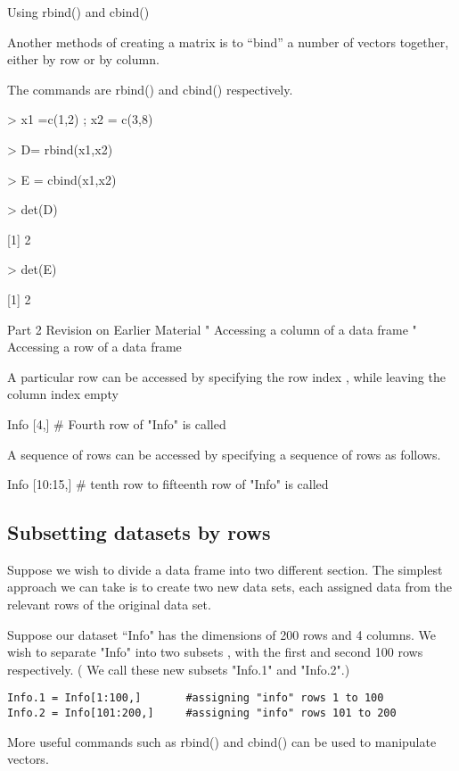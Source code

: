  








Using rbind() and cbind()

Another methods of creating a matrix is to “bind” a number of vectors together, either by row or by column. 

The commands are rbind() and cbind() respectively.








> x1 =c(1,2) ; x2 = c(3,8)                                                


> D= rbind(x1,x2)


> E = cbind(x1,x2)


> det(D)


[1] 2


> det(E)


[1] 2

 







Part 2 Revision on Earlier Material
"	Accessing a column of a data frame
"	Accessing a row of a data frame

A particular row can be accessed by specifying the row index , while leaving the column index empty

Info [4,]			# Fourth row of "Info" is called

A sequence of rows can be accessed by specifying a sequence of rows as follows.

Info [10:15,]		# tenth row to fifteenth row of "Info" is called


\subsection{Subsetting datasets by rows}

Suppose we wish to divide a data frame into two different section. The simplest approach we can take is to create two new data sets, each assigned data from the relevant rows of the original data set.

Suppose our dataset ``Info" has the dimensions of 200 rows and 4 columns. We wish to separate "Info" into two subsets , with the first and second 100 rows respectively. ( We call these new subsets "Info.1" and "Info.2".)
\begin{verbatim}
Info.1 = Info[1:100,]		#assigning "info" rows 1 to 100
Info.2 = Info[101:200,]		#assigning "info" rows 101 to 200
\end{verbatim}

More useful commands such as rbind() and cbind()  can be used to manipulate vectors.


